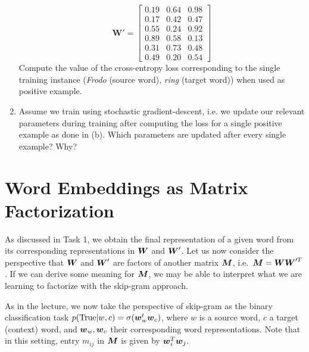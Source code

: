 \documentclass[11pt,a4paper]{article}
\begin{document}
\begin{enumerate}[label=(\alph*)]
\[              \mathbf{W'}=
              \begin{bmatrix}
                  0.19 & 0.64 & 0.98 \\
                  0.17 & 0.42 & 0.47 \\
                  0.55 & 0.24 & 0.92 \\
                  0.89 & 0.58 & 0.13 \\
                  0.31 & 0.73 & 0.48 \\
                  0.49 & 0.20 & 0.54
              \end{bmatrix}
          \]
          Compute the value of the cross-entropy loss corresponding to the
          single training instance (\textit{Frodo} (source word),
          \textit{ring} (target word)) when used as positive example.
    \item Assume we train using stochastic gradient-descent, i.e. we update our
          relevant parameters during training after computing the loss for a
          single positive example as done in (b).
          Which parameters are updated after every single example? Why?
\end{enumerate}

\section{Word Embeddings as Matrix Factorization}

As discussed in Task 1, we obtain the final representation of a given word from
its corresponding representations in ${\boldsymbol{W}}$ and ${\boldsymbol{W}}'$.
Let us now consider the perspective that ${\boldsymbol{W}}$ and ${\boldsymbol{W}}'$ are factors of another
matrix ${\boldsymbol{M}}$, i.e.\ ${\boldsymbol{M}} = {\boldsymbol{W}}{\boldsymbol{W}}'^T$.
If we can derive some meaning for ${\boldsymbol{M}}$, we may be able to interpret what we are
learning to factorize with the skip-gram approach.

As in the lecture, we now take the perspective of skip-gram as the binary
classification task $p(\text{True}|w,c) = \sigma({\boldsymbol{w}}_w^t{\boldsymbol{w}}_c)$, where $w$ is a
source word, $c$ a target (context) word, and ${\boldsymbol{w}}_w,{\boldsymbol{w}}_c$ their corresponding
word representations.
Note that in this setting, entry $m_{ij}$ in ${\boldsymbol{M}}$ is given by ${\boldsymbol{w}}_i^T{\boldsymbol{w}}_j$.
\end{document}
